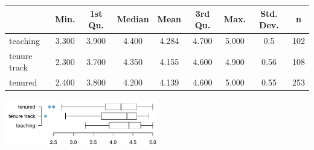 \documentclass[11pt]{article}
\begin{document}
{\small
\begin{center}
\begin{tabular}{l | c | c | c | c | c | c | c | c}
		& Min. & 1st Qu. & Median  &  Mean & 3rd Qu. &   Max. & Std. Dev. & n \\
\hline
teaching	&  3.300 &  3.900  & 4.400&   4.284 &  4.700&   5.000 	& 0.5 & 102 \\
tenure track	& 2.300 &  3.700 &  4.350  & 4.155 &  4.600  & 4.900 & 0.56 & 108 \\
tenured 	&   2.400   & 3.800 &  4.200  & 4.139  & 4.600 &  5.000  & 0.55 & 253
\end{tabular}
\includegraphics[width=0.5\textwidth]{figures/evals_rank}
\end{center}
}

%
\end{document}
